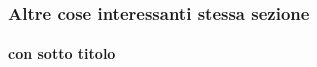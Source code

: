 \begin{frame}
    \frametitle{Altre cose interessanti stessa sezione}
    \framesubtitle{con sotto titolo}
    \addtocounter{nframe}{1}
    
    \begin{tiny}
    \end{tiny}

\end{frame}

